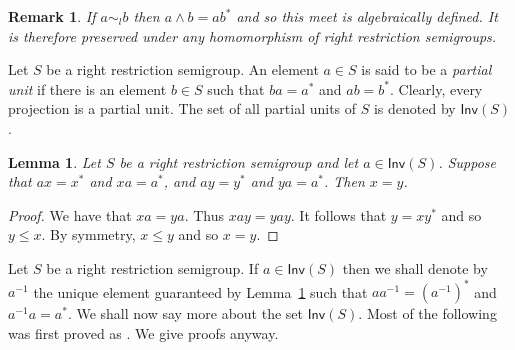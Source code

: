 \documentclass[a4paper]{amsart}
\newtheorem{lemma}[theorem]{Lemma}
\newtheorem{remark}[theorem]{Remark}
\begin{document}
\begin{remark}{\em If $a \sim_{l} b$ then $a \wedge b = ab^{\ast}$ and so
this meet is {\em algebraically defined}.
It is therefore preserved under any homomorphism of right restriction semigroups.}
\end{remark}

Let $S$ be a right restriction semigroup.
An element $a \in S$ is said to be a {\em partial unit}
if there is an element $b \in S$ such that $ba = a^{\ast}$ and $ab = b^{\ast}$.
Clearly, every projection is a partial unit.
The set of all partial units of $S$ is denoted by $\mathsf{Inv}(S)$.

\begin{lemma}\label{lem:spilled-tea} Let $S$ be a right restriction semigroup
and let $a \in \mathsf{Inv}(S)$.
Suppose that $ax = x^{\ast}$ and $xa = a^{\ast}$,
and $ay = y^{\ast}$ and $ya = a^{\ast}$.
Then $x = y$.
\end{lemma}
\begin{proof} We have that $xa = ya$.
Thus $xay = yay$.
It follows that $y = xy^{\ast}$ and so $y \leq x$.
By symmetry, $x \leq y$ and so $x = y$.
\end{proof}

Let $S$ be a right restriction semigroup.
If $a \in \mathsf{Inv}(S)$ then we shall denote by $a^{-1}$ the unique
element guaranteed by Lemma~\ref{lem:spilled-tea} such that $aa^{-1} = (a^{-1})^{\ast}$ and $a^{-1}a = a^{\ast}$.
We shall now say more about the set $\mathsf{Inv}(S)$.
Most of the following was first proved as \cite[Lemma 2.14]{CG}.
We give proofs anyway.
\end{document}
